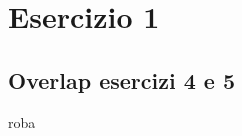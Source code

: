 \documentclass[12pt]{article}
\begin{document}

\section*{Esercizio 1}

\subsection*{Overlap esercizi 4 e 5}
roba
\end{document}
